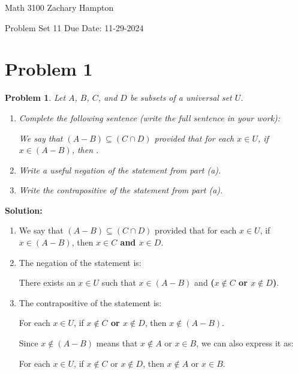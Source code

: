 \documentclass[12pt]{article}
\newtheorem{problem}{Problem}
\theoremstyle{definition}
\begin{document}
Math 3100 \hfill Zachary Hampton

Problem Set 11 \hfill Due Date: 11-29-2024

\bigskip

\section*{Problem 1}

\begin{problem}
Let $A$, $B$, $C$, and $D$ be subsets of a universal set $U$.

\begin{enumerate}[label=(\alph*)]
    \item Complete the following sentence (write the full sentence in your work):

    We say that $(A - B) \subseteq (C \cap D)$ provided that for each $x \in U$, if $x \in (A - B)$, then \underline{\hspace{4cm}}.

    \item Write a useful negation of the statement from part (a).

    \item Write the contrapositive of the statement from part (a).
\end{enumerate}
\end{problem}

\textbf{Solution:}

\begin{enumerate}[label=(\alph*)]
    \item We say that $(A - B) \subseteq (C \cap D)$ provided that for each $x \in U$, if $x \in (A - B)$, then \textbf{$x \in C$ and $x \in D$}.

    \item The negation of the statement is:

    There exists an $x \in U$ such that $x \in (A - B)$ and \textbf{($x \notin C$ or $x \notin D$)}.

    \item The contrapositive of the statement is:

    For each $x \in U$, if \textbf{$x \notin C$ or $x \notin D$}, then $x \notin (A - B)$.

    Since $x \notin (A - B)$ means that $x \notin A$ or $x \in B$, we can also express it as:

    For each $x \in U$, if $x \notin C$ or $x \notin D$, then $x \notin A$ or $x \in B$.
\end{enumerate}
\end{document}
